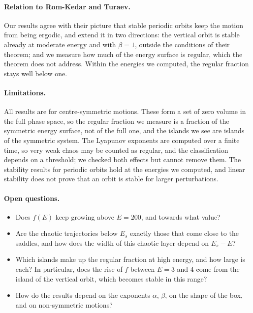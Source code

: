 \documentclass[11pt,a4paper]{article}
\begin{document}
\paragraph{Relation to Rom-Kedar and Turaev.}
Our results agree with their picture that stable periodic orbits keep the
motion from being ergodic, and extend it in two directions: the vertical orbit
is stable already at moderate energy and with $\beta=1$, outside the
conditions of their theorem; and we measure how much of the energy surface is
regular, which the theorem does not address. Within the energies we computed,
the regular fraction stays well below one.

\paragraph{Limitations.}
All results are for centre-symmetric motions. These form a set of zero volume
in the full phase space, so the regular fraction we measure is a fraction of
the symmetric energy surface, not of the full one, and the islands we see are
islands of the symmetric system. The Lyapunov exponents are computed over a
finite time, so very weak chaos may be counted as regular, and the
classification depends on a threshold; we checked both effects but cannot
remove them. The stability results for periodic orbits hold at the energies
we computed, and linear stability does not prove that an orbit is stable for
larger perturbations.

\paragraph{Open questions.}
\begin{itemize}
  \item Does $f(E)$ keep growing above $E=200$, and towards what value?
  \item Are the chaotic trajectories below $E_s$ exactly those that come close
        to the saddles, and how does the width of this chaotic layer depend on
        $E_s-E$?
  \item Which islands make up the regular fraction at high energy, and how
        large is each? In particular, does the rise of $f$ between $E=3$ and
        $4$ come from the island of the vertical orbit, which becomes stable
        in this range?
  \item How do the results depend on the exponents $\alpha$, $\beta$, on the
        shape of the box, and on non-symmetric motions?
\end{itemize}
\end{document}
